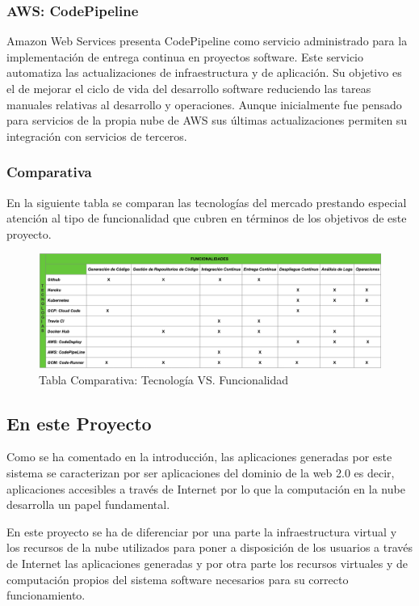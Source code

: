 \documentclass[a4paper,11pt]{book}
\begin{document}
\subsubsection{AWS: CodePipeline}
Amazon Web Services\cite{aws} presenta  CodePipeline\cite{awspipe} como servicio administrado para la implementación de entrega continua en proyectos software. Este servicio automatiza las actualizaciones de infraestructura y de aplicación. Su objetivo es el de mejorar el ciclo de vida del desarrollo software reduciendo las tareas manuales relativas al desarrollo y operaciones. Aunque inicialmente fue pensado para servicios de la propia nube de AWS sus últimas actualizaciones permiten su integración con servicios de terceros.  


\subsubsection{Comparativa}

En la siguiente tabla se comparan las tecnologías del mercado prestando especial atención al tipo de funcionalidad que cubren en términos de los objetivos de este proyecto. 

\begin{figure}[H]
\centering
\includegraphics[scale=0.30]{imagenes/comparativa.png}
\caption{ Tabla Comparativa: Tecnología VS. Funcionalidad }
\end{figure}


\subsection{En este Proyecto}

Como se ha comentado en la introducción, las aplicaciones generadas por este sistema se caracterizan por ser aplicaciones del dominio de la web 2.0 es decir, aplicaciones accesibles a través de Internet por lo que la computación en la nube desarrolla un papel fundamental. 

En este proyecto se ha de diferenciar por una parte la infraestructura virtual y los recursos de la nube utilizados para poner a disposición de los usuarios  a través de Internet las aplicaciones generadas y por otra parte los recursos virtuales y de computación propios del sistema software necesarios para su correcto funcionamiento. 
\end{document}
